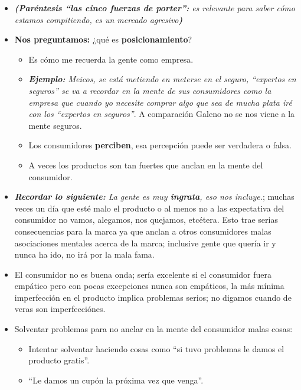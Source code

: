 \begin{itemize}
    \item \emph{\textbf{(Paréntesis ``las cinco fuerzas de porter'':} es relevante para saber cómo estamos compitiendo, es un mercado agresivo\textbf{)}}
    \item \textbf{Nos preguntamos:} ¿qué es \textbf{posicionamiento}?
        \begin{itemize}
            \item Es cómo me recuerda la gente como empresa.
            \item \emph{\textbf{Ejemplo: }Meicos, se está metiendo en meterse en el seguro, ``expertos en seguros'' se va a recordar en la mente de sus consumidores como la empresa que cuando yo necesite comprar algo que sea de mucha plata iré con los ``expertos en seguros''}. A comparación Galeno no se nos viene a la mente seguros.
            \item Los consumidores \textbf{perciben}, esa percepción puede ser verdadera o falsa. 
            \item A veces los productos son tan fuertes que anclan en la mente del consumidor.
        \end{itemize}
    
    \item \emph{\textbf{Recordar lo siguiente: }La gente es muy \textbf{ingrata}, eso nos incluye.}; muchas veces un día que esté malo el producto o al menos no a las expectativa del consumidor no vamos, alegamos, nos quejamos, etcétera. Esto trae serias consecuencias para la marca ya que anclan a otros consumidores malas asociaciones mentales acerca de la marca; inclusive gente que quería ir y nunca ha ido, no irá por la mala fama.
    \item El consumidor no es buena onda; sería excelente si el consumidor fuera empático pero con pocas excepciones nunca son empáticos, la más mínima imperfección en el producto implica problemas serios; no digamos cuando de veras son imperfecciónes.
    \item Solventar problemas para no anclar en la mente del consumidor malas cosas:
        \begin{itemize}
            \item Intentar solventar haciendo cosas como ``si tuvo problemas le damos el producto gratis''.
            \item ``Le damos un cupón la próxima vez que venga''.
        \end{itemize}
    

\end{itemize}
